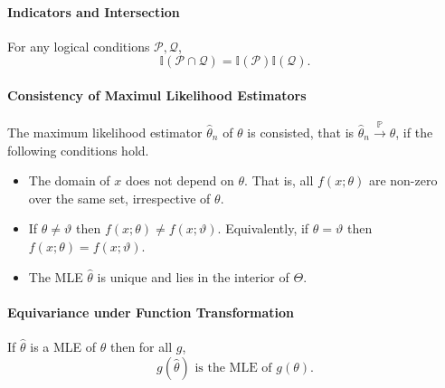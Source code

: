 \paragraph{Indicators and Intersection}
For any logical conditions \(\mathcal{P}, \mathcal{Q}\), \[
  \mathbb{I}(\mathcal{P} \cap \mathcal{Q}) = \mathbb{I}(\mathcal{P})\mathbb{I}(\mathcal{Q})
.\] 

\paragraph{Consistency of Maximul Likelihood Estimators}
The maximum likelihood estimator \(\hat{\theta}_n\) of \(\theta\)
is consisted, that is \(\hat{\theta}_n \xrightarrow{\mathbb{P}} \theta\),
if the following conditions hold.
\begin{itemize}
  \item The domain of \(x\) does not depend on  \(\theta\). That is,  all \(f(x; \theta)\)
    are non-zero over the same set, irrespective of \(\theta\).
  \item If \(\theta \neq \vartheta\) then \( f(x; \theta) \neq f(x; \vartheta)\).
    Equivalently, if  \(\theta = \vartheta\) then \(f(x; \theta) = f(x; \vartheta)\).
  \item The MLE \(\hat{\theta}\) is unique and lies in the interior of \(\Theta\).
\end{itemize}

\paragraph{Equivariance under Function Transformation}
If \(\hat{\theta}\) is a MLE of \(\theta\) then for all \(g\),  \[
  g(\hat{\theta}) \text{ is the MLE of } g(\theta)
.\] 


